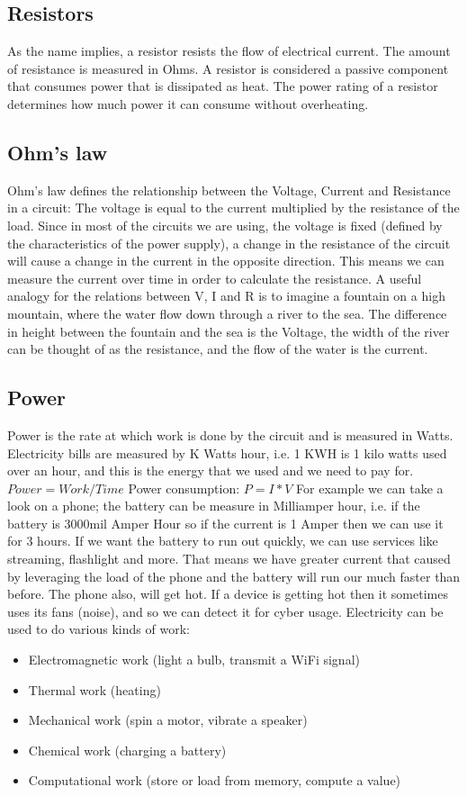 \subsection{Resistors}
As the name implies, a resistor resists the flow of electrical current. The amount of resistance is measured in Ohms. A resistor is considered a passive component that consumes power that is dissipated as heat. The power rating of a resistor determines how much power it can consume without overheating.
\newline
\subsection{ Ohm's law}
Ohm's law defines the relationship between the Voltage, Current and Resistance in a circuit: The voltage is equal to the current multiplied by the resistance of the load. Since in most of the circuits we are using, the voltage is fixed (defined by the characteristics of the power supply), a change in the resistance of the circuit will cause a change in the current in the opposite direction. This means we can measure the current over time in order to calculate the resistance.
A useful analogy for the relations between V, I and R is to imagine a fountain on a high mountain, where the water flow down through a river to the sea. The difference in height between the fountain and the sea is the Voltage, the width of the river can be thought of as the resistance, and the flow of the water is the current.
\subsection{Power}
Power is the rate at which work is done by the circuit and is measured in Watts. Electricity bills are measured by K Watts hour, i.e. 1 KWH is 1 kilo watts used over an hour, and this is the energy that we used and we need to pay for.
$Power = Work / Time$
\newline
Power consumption: $P=I*V$
For example we can take a look on a phone; the battery can be measure in Milliamper hour, i.e. if the battery is 3000mil Amper Hour so if the current is 1 Amper then we can use it for 3 hours. If we want the battery to run out quickly, we can use services like streaming, flashlight and more. That means we have greater current that caused by leveraging the load of the phone and the battery will run our much faster than before. The phone also, will get hot. If a device is getting hot then it sometimes uses its fans (noise), and so we can detect it for cyber usage.
\newline
Electricity can be used to do various kinds of work:
\begin{itemize}
    \item Electromagnetic work (light a bulb, transmit a WiFi signal)
    \item Thermal work (heating)
    \item Mechanical work (spin a motor, vibrate a speaker)
    \item Chemical work (charging a battery)
    \item Computational work (store or load from memory, compute a value)
\end{itemize}
